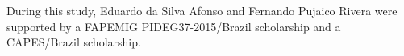 During this study, Eduardo da Silva Afonso and Fernando Pujaico Rivera were supported 
by a FAPEMIG PIDEG37-2015/Brazil scholarship and a CAPES/Brazil scholarship.